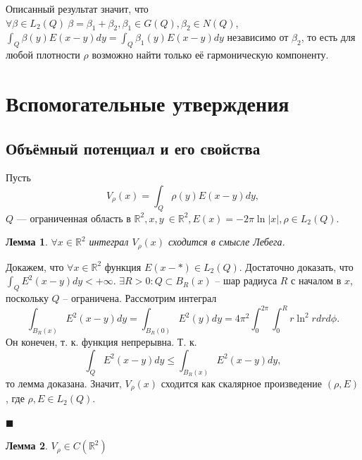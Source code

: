 \documentclass[a4paper, 12pt]{article}
\newcommand{\V}[1]{\int_Q #1(y) E(x-y) dy}
\newcommand{\R}[1]{\mathbb{R}^#1}
\newtheorem{Lem}{Лемма}
\newenvironment{Proof} %
{\par\noindent{\bf Доказательство.}} %
{\hfill$\scriptstyle\blacksquare$} %
\begin{document}
Описанный результат значит, что $\forall \beta \in L_2(Q) \ \beta = \beta_1 + \beta_2, \beta_1 \in G(Q), \beta_2 \in N(Q)$, $\V{\beta}=\V{\beta_1}$ независимо от $\beta_2$, то есть для любой плотности $\rho$ возможно найти только её гармоническую компоненту.   

\section{Вспомогательные утверждения}
\subsection{Объёмный потенциал и его свойства}

Пусть
$$V_{\rho}(x)=\int_Q \rho(y) E(x-y) dy,$$
$Q$ --- ограниченная область в $\R{2}, x,y \ \in \R{2}, E(x)= -2 \pi \ln|x|, \rho \in L_2(Q)$.

\begin{Lem}
  $\forall x \in \R{2}$ интеграл $V_{\rho}(x)$ сходится в смысле Лебега.
\end{Lem}
\begin{Proof}
  Докажем, что $\forall x \in \R{2}$ функция $E(x-*) \in L_2(Q)$. Достаточно доказать, что $\int_Q E^2 (x-y) dy < +\infty$. $\exists R>0: Q \subset B_R(x)$ -- шар радиуса $R$ с началом в $x$, поскольку $Q$ -- ограничена.
Рассмотрим интеграл 
$$\int_{B_R(x)} E^2(x-y) dy=\int_{B_R(0)}E^2(y)dy=4\pi^2 \int^{2 \pi}_0 \int^R_0 r\ln^2 r dr d\phi.$$
Он конечен, т. к. функция непрерывна. Т. к.
$$\int_Q E^2(x-y)dy \leq \int_{B_R(x)}E^2(x-y)dy,$$
то лемма доказана. Значит, $V_{\rho}(x)$ сходится как скалярное произведение $(\rho, E)$, где $\rho, E \in L_2(Q)$.

\end{Proof}

\begin{Lem}
  $V_{\rho} \in C(\R{2})$
\end{Lem}
\end{document}
